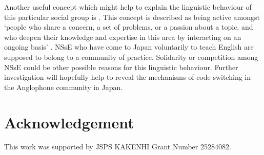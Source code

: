 \documentclass[output=paper]{LSP/langsci}
\begin{document}
Another useful concept which might help to explain the linguistic behaviour of this particular social group is  \citep{eckert_adolescent_1988}. This concept is described as being active amongst ‘people who share a concern, a set of problems, or a passion about a topic, and who deepen their knowledge and expertise in this area by interacting on an ongoing basis’ \citep[4]{wenger_cultivating_2002}. NSsE who have come to Japan voluntarily to teach English are supposed to belong to a community of practice. Solidarity or competition among NSsE could be other possible reasons for this linguistic behaviour. Further investigation will hopefully help to reveal the mechanisms of code-switching in the Anglophone community in Japan.

\section*{Acknowledgement}
This work was supported by JSPS KAKENHI Grant Number 25284082.

\printbibliography[heading=subbibliography,notkeyword=this]
\end{document}
